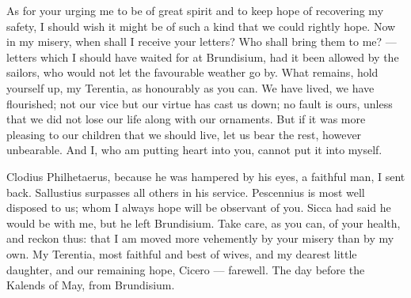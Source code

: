  As for your urging me to be of great spirit and to keep hope of recovering my safety, I should wish it might be of such a kind that we could rightly hope. Now in my misery, when shall I receive your letters? Who shall bring them to me? --- letters which I should have waited for at Brundisium, had it been allowed by the sailors, who would not let the favourable weather go by. What remains, hold yourself up, my Terentia, as honourably as you can. We have lived, we have flourished; not our vice but our virtue has cast us down; no fault is ours, unless that we did not lose our life along with our ornaments. But if it was more pleasing to our children that we should live, let us bear the rest, however unbearable. And I, who am putting heart into you, cannot put it into myself.

 Clodius Philhetaerus, because he was hampered by his eyes, a faithful man, I sent back. Sallustius surpasses all others in his service. Pescennius is most well disposed to us; whom I always hope will be observant of you. Sicca had said he would be with me, but he left Brundisium. Take care, as you can, of your health, and reckon thus: that I am moved more vehemently by your misery than by my own. My Terentia, most faithful and best of wives, and my dearest little daughter, and our remaining hope, Cicero --- farewell. The day before the Kalends of May, from Brundisium.
